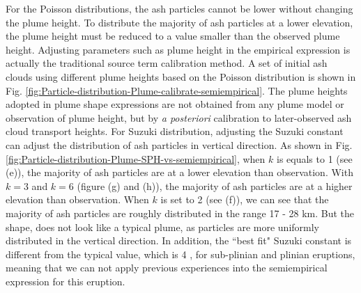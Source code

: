 \documentclass[utf8]{frontiersSCNS} %
\begin{document}
For the Poisson distributions, the ash particles cannot be lower without changing the plume height. To distribute the majority of ash particles at a lower elevation, the plume height must be reduced to a value smaller than the observed plume height. Adjusting parameters such as plume height in the empirical expression is actually the traditional source term calibration method. A set of initial ash clouds using different plume heights based on the Poisson distribution is shown in Fig. \ref{fig:Particle-distribution-Plume-calibrate-semiempirical}. The plume heights adopted in plume shape expressions are not obtained from any plume model or observation of plume height, but by \textit{a posteriori} calibration to later-observed ash cloud transport heights. For Suzuki distribution, adjusting the Suzuki constant can adjust the distribution of ash particles in vertical direction. As shown in Fig. \ref{fig:Particle-distribution-Plume-SPH-vs-semiempirical}, when $k$ is equals to 1 (see (e)), the majority of ash particles are at a lower elevation than observation. With $k=3$ and $k = 6$ (figure (g) and (h)), the majority of ash particles are at a higher elevation than observation. When $k$ is set to 2 (see (f)), we can see that the majority of  ash particles are roughly distributed in the range 17 - 28 km. But the shape, does not look like a typical plume, as particles are more uniformly distributed in the vertical direction. In addition, the ``best fit" Suzuki constant is different from the typical value, which is 4 \citep{pfeiffer2005model}, for sub-plinian and plinian eruptions, meaning that we can not apply previous experiences into the semiempirical expression for this eruption.
\end{document}
